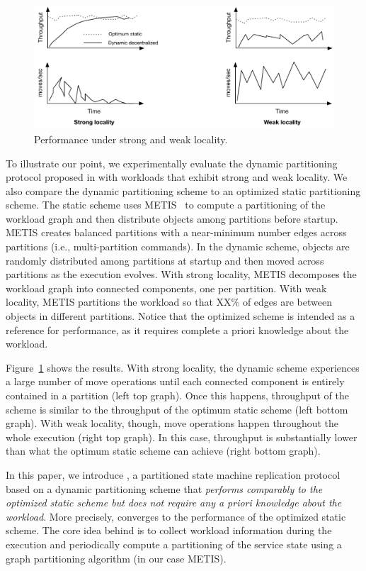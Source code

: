 \begin{figure}[ht]
	\center
	\includegraphics[width=0.6\linewidth]{figures/motivation}
	\caption{Performance under strong and weak locality.}
	\label{fig:motivation}
\end{figure}

To illustrate our point, we experimentally evaluate the dynamic partitioning protocol proposed in \cite{hoang2016} with workloads that exhibit strong and weak locality.
We also compare the dynamic partitioning scheme to an optimized static partitioning scheme.
The static scheme uses METIS~\cite{Abou-Rjeili:2006} to compute a partitioning of the workload graph and then distribute objects among partitions before startup.
METIS creates balanced partitions with a near-minimum number edges across partitions (i.e., multi-partition commands).
In the dynamic scheme, objects are randomly distributed among partitions at startup and then moved across partitions as the execution evolves.
With strong locality, METIS decomposes the workload graph into connected components, one per partition.
With weak locality, METIS partitions the workload so that XX\% of edges are between objects in different partitions.
Notice that the optimized scheme is intended as a reference for performance, as it requires complete a priori knowledge about the workload.

Figure~\ref{fig:motivation} shows the results.
With strong locality, the dynamic scheme experiences a large number of move operations until each connected component is entirely contained in a partition (left top graph).
Once this happens, throughput of the scheme is similar to the throughput of the optimum static scheme  (left bottom graph).
With weak locality, though, move operations happen throughout the whole execution (right top graph).
In this case, throughput is substantially lower than what the optimum static scheme can achieve (right bottom graph).

In this paper, we introduce \dynastar, a partitioned state machine replication protocol based on a dynamic partitioning scheme that \emph{performs comparably to the optimized static scheme but does not require any a priori knowledge about the workload}.
More precisely, \dynastar converges to the performance of the optimized static scheme.
The core idea behind \dynastar is to collect workload information during the execution and periodically compute a partitioning of the service state using a graph partitioning algorithm (in our case METIS).


